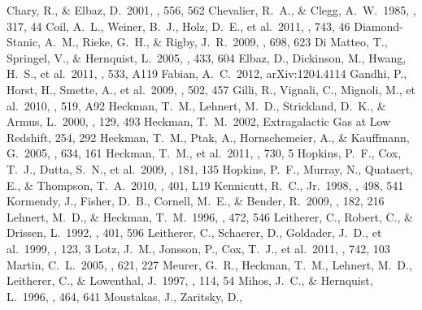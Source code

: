 \documentclass[12pt,preprint]{aastex}
\begin{document}
\begin{thebibliography}{}
 Chary, R., \& Elbaz, D.\ 2001,
  \apj, 556, 562
 Chevalier, R.~A., \& Clegg,
  A.~W.\ 1985, \nat, 317, 44
 Coil, A.~L., Weiner, B.~J., Holz,
  D.~E., et al.\ 2011, \apj, 743, 46
 Diamond-Stanic, A.~M.,
  Rieke, G.~H., \& Rigby, J.~R.\ 2009, \apj, 698, 623
 Di Matteo, T., Springel, V.,
  \& Hernquist, L.\ 2005, \nat, 433, 604
 Elbaz, D., Dickinson, M., Hwang,
  H.~S., et al.\ 2011, \aap, 533, A119
 Fabian, A.~C.\ 2012,
  arXiv:1204.4114
 Gandhi, P., Horst, H., Smette,
  A., et al.\ 2009, \aap, 502, 457
 Gilli, R., Vignali, C., Mignoli,
  M., et al.\ 2010, \aap, 519, A92
 Heckman, T.~M., Lehnert, M.~D.,
  Strickland, D.~K., \& Armus, L.\ 2000, \apjs, 129, 493
 Heckman, T.~M.\ 2002, Extragalactic Gas
  at Low Redshift, 254, 292
 Heckman, T.~M., Ptak, A.,
  Hornschemeier, A., \& Kauffmann, G.\ 2005, \apj, 634, 161
 Heckman, T.~M., et al.\ 2011,
  \apj, 730, 5
 Hopkins, P.~F., Cox, T.~J.,
  Dutta, S.~N., et al.\ 2009, \apjs, 181, 135
 Hopkins, P.~F., Murray, N.,
  Quataert, E., \& Thompson, T.~A.\ 2010, \mnras, 401, L19
 Kennicutt, R.~C., Jr.\ 1998, \apj,
  498, 541
 Kormendy, J., Fisher, D.~B.,
  Cornell, M.~E., \& Bender, R.\ 2009, \apjs, 182, 216
 Lehnert, M.~D., \& Heckman,
  T.~M.\ 1996, \apj, 472, 546
 Leitherer, C., Robert, C., \&
  Drissen, L.\ 1992, \apj, 401, 596
 Leitherer, C., Schaerer, D.,
  Goldader, J.~D., et al.\ 1999, \apjs, 123, 3
 Lotz, J.~M., Jonsson, P., Cox,
  T.~J., et al.\ 2011, \apj, 742, 103
 Martin, C.~L.\ 2005, \apj, 621, 227
 Meurer, G.~R., Heckman, T.~M.,
  Lehnert, M.~D., Leitherer, C., \& Lowenthal, J.\ 1997, \aj, 114, 54
 Mihos, J.~C., \& Hernquist,
  L.\ 1996, \apj, 464, 641
 Moustakas, J., Zaritsky, D.,

\end{thebibliography}
\end{document}

